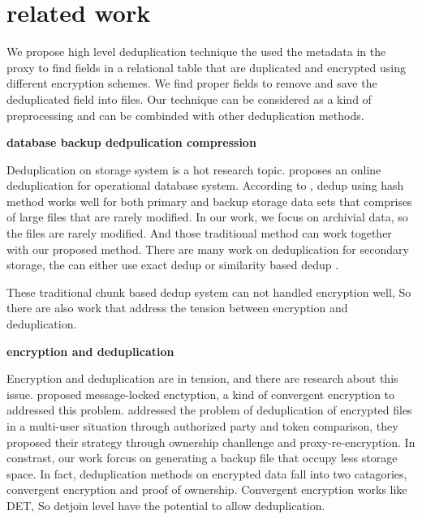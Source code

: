 \section{related work}

We propose high level deduplication technique the used the metadata in the proxy to find fields in a relational table that are duplicated and encrypted using different encryption schemes. We find proper fields to remove and save the deduplicated field into files. Our technique can be considered as a kind of preprocessing and can be combinded with other deduplication methods.


\textbf{database backup dedpulication compression} 

Deduplication on storage system is a hot research topic\citep{paulo2014survey}.\citep{xu2017online} proposes an online deduplication for operational database system. According to \citep{xu2017online}, dedup using hash method works well for both primary and backup storage data sets that comprises of large files that are rarely modified. In our work, we focus on archivial data, so the files are rarely modified. And those traditional method can work together with our proposed method. There are many work on deduplication for secondary storage, the can either use exact dedup\citep{dubnicki2009hydrastor} or similarity based dedup\citep{xu2015reducing} \citep{aronovich2009design}\citep{you2005deep}.

These traditional chunk based dedup system can not handled encryption well, So there are also work that address the tension between encryption and deduplication.

\textbf{encryption and deduplication}

Encryption and deduplication are in tension, and there are research about this issue.\citep{bellare2013message} \citep{puzio2015perfectdedup} proposed message-locked enctyption, a kind of convergent encryption to addressed this problem. \citep{yan2016deduplication} addressed the problem of deduplication of encrypted files in a multi-user situation through authorized party and token comparison, they proposed their strategy through ownership chanllenge and proxy-re-encryption. In constrast, our work forcus on generating a backup file that occupy less storage space. In fact, deduplication methods on encrypted data fall into two catagories, convergent encryption and proof of ownership\citep{akhila2016study}. Convergent encryption works like DET, So detjoin level have the potential to allow deduplication.

